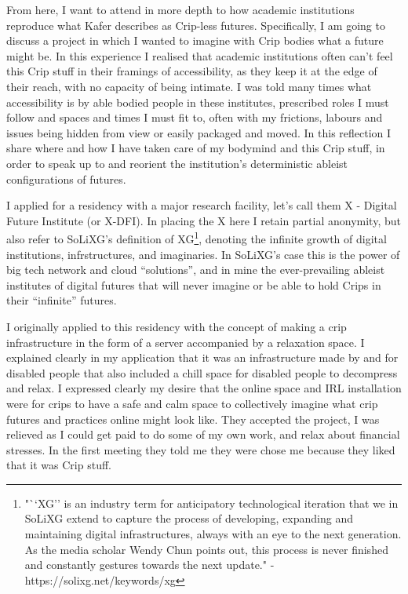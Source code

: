 From here, I want to attend in more depth to how academic institutions
reproduce what Kafer describes as Crip-less futures. Specifically, I am
going to discuss a project in which I wanted to imagine with Crip bodies
what a future might be. In this experience I realised that academic
institutions often can't feel this Crip stuff in their framings of
accessibility, as they keep it at the edge of their reach, with no
capacity of being intimate. I was told many times what accessibility is
by able bodied people in these institutes, prescribed roles I must
follow and spaces and times I must fit to, often with my frictions,
labours and issues being hidden from view or easily packaged and moved.
In this reflection I share where and how I have taken care of my
bodymind and this Crip stuff, in order to speak up to and reorient the
institution's deterministic ableist configurations of futures.

I applied for a residency with a major research facility, let's call
them X - Digital Future Institute (or X-DFI). In placing the X here I
retain partial anonymity, but also refer to SoLiXG's definition of
XG\footnote{"``XG'' is an industry term for anticipatory technological
  iteration that we in SoLiXG extend to capture the process of
  developing, expanding and maintaining digital infrastructures, always
  with an eye to the next generation. As the media scholar Wendy Chun
  points out, this process is never finished and constantly gestures
  towards the next update." - https://solixg.net/keywords/xg}, denoting
the infinite growth of digital institutions, infrstructures, and
imaginaries. In SoLiXG's case this is the power of big tech network and
cloud ``solutions'', and in mine the ever-prevailing ableist institutes
of digital futures that will never imagine or be able to hold Crips in
their ``infinite'' futures.

I originally applied to this residency with the concept of making a crip
infrastructure in the form of a server accompanied by a relaxation
space. I explained clearly in my application that it was an
infrastructure made by and for disabled people that also included a
chill space for disabled people to decompress and relax. I expressed
clearly my desire that the online space and IRL installation were for
crips to have a safe and calm space to collectively imagine what crip
futures and practices online might look like. They accepted the project,
I was relieved as I could get paid to do some of my own work, and relax
about financial stresses. In the first meeting they told me they were
chose me because they liked that it was Crip stuff.

